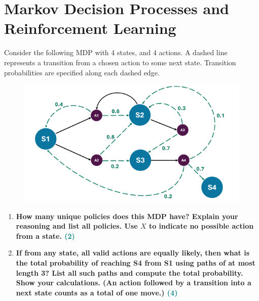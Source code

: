 \documentclass[a4paper]{article}
\begin{document}
\begin{sloppypar}
\begin{enumerate}[start=6,label=Q\arabic*,left=0pt]
    \par 

\end{enumerate}

\section{Markov Decision Processes and Reinforcement Learning}

Consider the following MDP with 4 states, and 4 actions. A dashed line represents a
transition from a chosen action to some next state. Transition probabilities are specified
along each dashed edge.

\begin{figure}[H]
    \centering  
    \includegraphics[height=0.3\textheight]{mdp_and_rl.png}
    \label{fig:mdp_and_rl}
\end{figure}

\begin{enumerate}[start=8,label=Q\arabic*,left=0pt]
    \item \textbf{How many unique policies does this MDP have? Explain your reasoning and list all policies. Use $X$ to indicate no possible action from a state. \hfill \textcolor{teal}{(2)}}
    
    \par 
    
    \item \textbf{If from any state, all valid actions are equally likely, then what is the total probability
    of reaching S4 from S1 using paths of at most length 3? List all such paths and compute
    the total probability. Show your calculations. (An action followed by a transition into a next
    state counts as a total of one move.) \hfill \textcolor{teal}{(4)}}
    
    \par


\end{enumerate}
\end{sloppypar}
\end{document}
